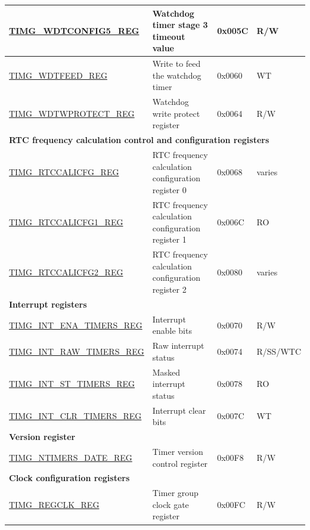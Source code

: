 \begin{longtable}{ | p{6cm} | p{6.7cm} | p{1.3cm} | p{1.5cm} | }
\hyperref[regdesc:TIMGWDTCONFIG5REG]{TIMG\_WDTCONFIG5\_REG} & Watchdog timer stage 3 timeout value & 0x005C & R/W \\ \hline
\hyperref[regdesc:TIMGWDTFEEDREG]{TIMG\_WDTFEED\_REG} & Write to feed the watchdog timer & 0x0060 & WT \\ \hline
\hyperref[regdesc:TIMGWDTWPROTECTREG]{TIMG\_WDTWPROTECT\_REG} & Watchdog write protect register & 0x0064 & R/W \\ \hline
\multicolumn{4}{|l|}{\textbf{RTC frequency calculation control and configuration registers}} \\ \hline
\hyperref[regdesc:TIMGRTCCALICFGREG]{TIMG\_RTCCALICFG\_REG} & RTC frequency calculation configuration register 0 & 0x0068 & varies \\ \hline
\hyperref[regdesc:TIMGRTCCALICFG1REG]{TIMG\_RTCCALICFG1\_REG} & RTC frequency calculation configuration register 1 & 0x006C & RO \\ \hline
\hyperref[regdesc:TIMGRTCCALICFG2REG]{TIMG\_RTCCALICFG2\_REG} & RTC frequency calculation configuration register 2 & 0x0080 & varies \\ \hline
\multicolumn{4}{|l|}{\textbf{Interrupt registers}} \\ \hline
\hyperref[regdesc:TIMGINTENATIMERSREG]{TIMG\_INT\_ENA\_TIMERS\_REG} & Interrupt enable bits & 0x0070 & R/W \\ \hline
\hyperref[regdesc:TIMGINTRAWTIMERSREG]{TIMG\_INT\_RAW\_TIMERS\_REG} & Raw interrupt status & 0x0074 & R/SS/WTC \\ \hline
\hyperref[regdesc:TIMGINTSTTIMERSREG]{TIMG\_INT\_ST\_TIMERS\_REG} & Masked interrupt status & 0x0078 & RO \\ \hline
\hyperref[regdesc:TIMGINTCLRTIMERSREG]{TIMG\_INT\_CLR\_TIMERS\_REG} & Interrupt clear bits & 0x007C & WT \\ \hline
\multicolumn{4}{|l|}{\textbf{Version register}} \\ \hline
\hyperref[regdesc:TIMGNTIMERSDATEREG]{TIMG\_NTIMERS\_DATE\_REG} & Timer version control register & 0x00F8 & R/W \\ \hline
\multicolumn{4}{|l|}{\textbf{Clock configuration registers}} \\ \hline
\hyperref[regdesc:TIMGREGCLKREG]{TIMG\_REGCLK\_REG} & Timer group clock gate register & 0x00FC & R/W \\ \hline
\end{longtable}
